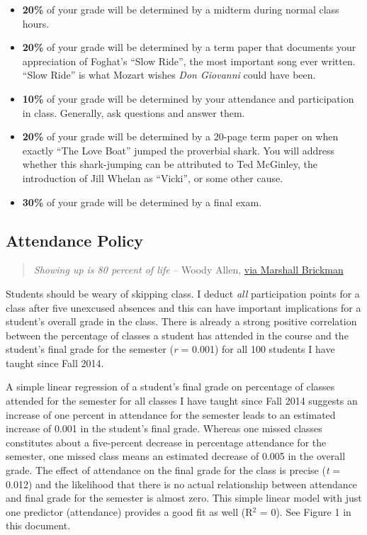 \documentclass[]{article}
\begin{document}
\begin{itemize}
\item
  \textbf{20\%} of your grade will be determined by a midterm during
  normal class hours.
\item
  \textbf{20\%} of your grade will be determined by a term paper that
  documents your appreciation of Foghat's ``Slow Ride'', the most
  important song ever written. ``Slow Ride'' is what Mozart wishes
  \emph{Don Giovanni} could have been.
\item
  \textbf{10\%} of your grade will be determined by your attendance and
  participation in class. Generally, ask questions and answer them.
\item
  \textbf{20\%} of your grade will be determined by a 20-page term paper
  on when exactly ``The Love Boat'' jumped the proverbial shark. You
  will address whether this shark-jumping can be attributed to Ted
  McGinley, the introduction of Jill Whelan as ``Vicki'', or some other
  cause.
\item
  \textbf{30\%} of your grade will be determined by a final exam.
\end{itemize}

\subsection{Attendance Policy}\label{attendance-policy}

\begin{quote}
\emph{Showing up is 80 percent of life} -- Woody Allen,
\href{http://quoteinvestigator.com/2013/06/10/showing-up/\#note-6553-1}{via
Marshall Brickman}
\end{quote}

Students should be weary of skipping class. I deduct \emph{all}
participation points for a class after five unexcused absences and this
can have important implications for a student's overall grade in the
class. There is already a strong positive correlation between the
percentage of classes a student has attended in the course and the
student's final grade for the semester (\emph{r} = 0.001) for all 100
students I have taught since Fall 2014.

A simple linear regression of a student's final grade on percentage of
classes attended for the semester for all classes I have taught since
Fall 2014 suggests an increase of one percent in attendance for the
semester leads to an estimated increase of 0.001 in the student's final
grade. Whereas one missed classes constitutes about a five-percent
decrease in percentage attendance for the semester, one missed class
means an estimated decrease of 0.005 in the overall grade. The effect of
attendance on the final grade for the class is precise (\emph{t} =
0.012) and the likelihood that there is no actual relationship between
attendance and final grade for the semester is almost zero. This simple
linear model with just one predictor (attendance) provides a good fit as
well (R\(^2\) = 0). See Figure 1 in this document.
\end{document}
